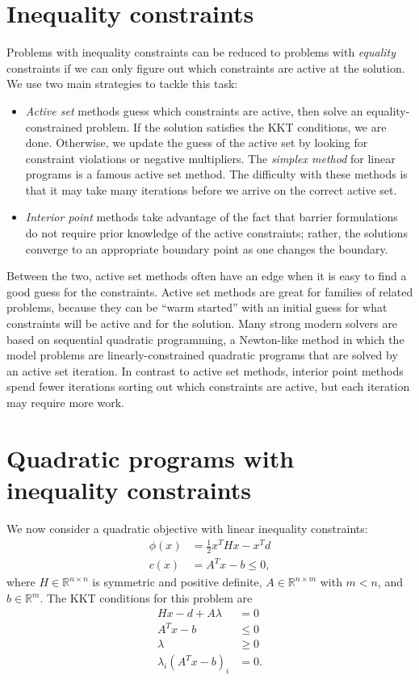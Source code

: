 \documentclass[12pt, leqno]{article} %
\providecommand{\tightlist}{%
  \setlength{\itemsep}{0pt}\setlength{\parskip}{0pt}}
\begin{document}

\section{Inequality constraints}

Problems with inequality constraints can be reduced to problems with
\emph{equality} constraints if we can only figure out which constraints
are active at the solution. We use two main strategies to tackle this
task:

\begin{itemize}
\tightlist
\item
  \emph{Active set} methods guess which constraints are active, then
  solve an equality-constrained problem. If the solution satisfies the
  KKT conditions, we are done. Otherwise, we update the guess of the
  active set by looking for constraint violations or negative
  multipliers. The \emph{simplex method} for linear programs is a famous
  active set method. The difficulty with these methods is that it may
  take many iterations before we arrive on the correct active set.
\item
  \emph{Interior point} methods take advantage of the fact that barrier
  formulations do not require prior knowledge of the active constraints;
  rather, the solutions converge to an appropriate boundary point as one
  changes the boundary.
\end{itemize}

Between the two, active set methods often have an edge when it is easy
to find a good guess for the constraints. Active set methods are great
for families of related problems, because they can be ``warm started''
with an initial guess for what constraints will be active and for the
solution. Many strong modern solvers are based on sequential quadratic
programming, a Newton-like method in which the model problems are
linearly-constrained quadratic programs that are solved by an active set
iteration. In contrast to active set methods, interior point methods
spend fewer iterations sorting out which constraints are active, but
each iteration may require more work.

\section{Quadratic programs with inequality constraints}

We now consider a quadratic objective with linear inequality
constraints: \begin{align*}
  \phi(x) &= \frac{1}{2} x^T H x - x^T d \\
  c(x) &= A^T x-b \leq 0,
\end{align*} where \(H \in {\mathbb{R}}^{n \times n}\) is symmetric and
positive definite, \(A \in {\mathbb{R}}^{n \times m}\) with \(m < n\),
and \(b \in {\mathbb{R}}^m\). The KKT conditions for this problem are
\begin{align*}
  Hx - d + A\lambda &= 0 \\
  A^T x-b & \leq 0 \\
  \lambda & \geq 0 \\
  \lambda_i (A^T x-b)_i &= 0.
\end{align*}
\end{document}
